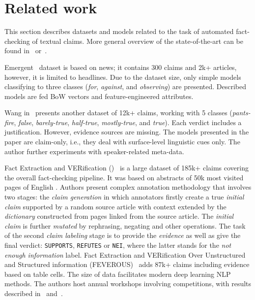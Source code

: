 \section{Related work}\label{sec:related_work}
This section describes datasets and models related to the task of automated fact-checking of textual claims.
More general overview of the state-of-the-art can be found in~\cite{zeng2021fcsurvey} or~\cite{murayama2021dataset}.

Emergent~\cite{ferreira2016emergent} dataset is based on news; it contains 300 claims and 2k+ articles, however, it is limited to headlines.
Due to the dataset size, only simple models classifying to three classes (\textit{for}, \textit{against}, and \textit{observing}) are presented.
Described models are fed BoW vectors and feature-engineered attributes.

Wang in~\cite{wang2017liar} presents another dataset of 12k+ claims, working with 5 classes (\textit{pants-fire}, \textit{false}, \textit{barely-true}, \textit{half-true}, \textit{mostly-true}, and \textit{true}).
Each verdict includes a justification. 
However, evidence sources are missing.
The models presented in the paper are claim-only, i.e., they deal with surface-level linguistic cues only.
The author further experiments with speaker-related meta-data.

Fact Extraction and VERification (\FEVER)~\cite{fever2018} is a large dataset of 185k+ claims covering the overall fact-checking pipeline. 
It was based on abstracts of 50k most visited pages of English \Wikipedia.
Authors present complex annotation methodology that involves two stages: the \textit{claim generation} in which annotators firstly create a true \textit{initial claim} supported by a random \Wikipedia source article with context extended by the \textit{dictionary} constructed from pages linked from the source article.
The \textit{initial claim} is further \textit{mutated} by rephrasing, negating and other operations.
The task of the second \textit{claim labeling} stage is to provide the \textit{evidence} as well as give the final verdict: \texttt{SUPPORTS}, \texttt{REFUTES} or \texttt{NEI}, where the latter stands for the \textit{not enough information} label.
Fact Extraction and VERification Over Unstructured and Structured information (\textsc{FEVEROUS})~\cite{aly2021feverous} adds 87k+ claims including evidence based on \Wikipedia table cells.
The size of \FEVER data facilitates modern deep learning NLP methods.
The \FEVER authors host annual workshops involving competitions, with results described in~\cite{fever2018b} and~\cite{thorne2019fever2}.

